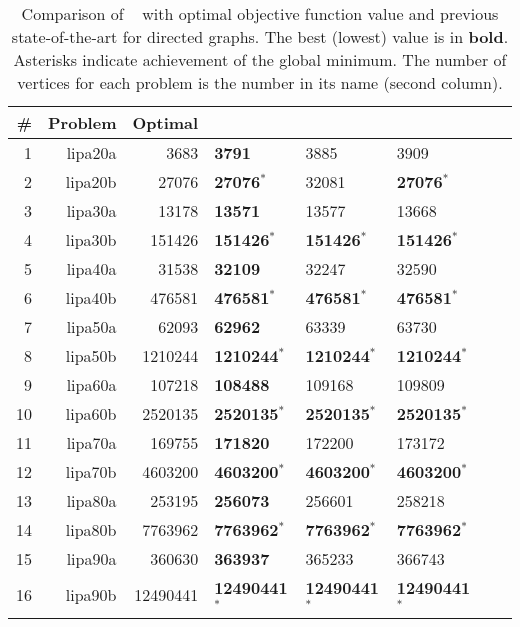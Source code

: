\begin{table}[h!]
\caption{Comparison of \FAQ~ with optimal objective function value and previous state-of-the-art for directed graphs.  The best (lowest) value is in \textbf{bold}. Asterisks indicate achievement of the global minimum.  The number of vertices for each problem is the number in its name (second column).}
\begin{center}
\begin{tabular}{|r|r|r||l|l|l|l|l|}
	\hline 
	          \# &  Problem &      Optimal & \FAQ~ & \Epath~& \Grad~ \\
	\hline 
	           1 &  lipa20a &     3683 & \textbf{3791} &     3885 &     3909 \\ 
	           2 &  lipa20b &    27076 & \textbf{27076}$^*$ &    32081 &    \textbf{27076}$^*$ \\ 
	           3 &  lipa30a &    13178 & \textbf{13571} 	&    13577 &    13668 \\ 
	           4 &  lipa30b &   151426 & \textbf{151426}$^*$ & \textbf{151426}$^*$ &   \textbf{151426}$^*$ \\ 
	           5 &  lipa40a &    31538 & \textbf{32109} 	&    32247 &    32590 \\ 
	           6 &  lipa40b &   476581 & \textbf{476581}$^*$ &   \textbf{476581}$^*$ &   \textbf{476581}$^*$ \\ 
	           7 &  lipa50a &    62093 & \textbf{62962} &    63339 &    63730 \\ 
	           8 &  lipa50b &  1210244 & \textbf{1210244}$^*$ &  \textbf{1210244}$^*$ &  \textbf{1210244}$^*$ \\ 
	           9 &  lipa60a &   107218 & \textbf{108488} &   109168 &   109809 \\ 
	          10 &  lipa60b &  2520135 & \textbf{2520135}$^*$ &  \textbf{2520135}$^*$ &  \textbf{2520135}$^*$ \\ 
	          11 &  lipa70a &   169755 & \textbf{171820} &   172200 &   173172 \\ 
	          12 &  lipa70b &  4603200 & \textbf{4603200}$^*$ &  \textbf{4603200}$^*$ &  \textbf{4603200}$^*$ \\ 
	          13 &  lipa80a &   253195 & \textbf{256073} &   256601 &   258218 \\ 
	          14 &  lipa80b &  7763962 & \textbf{7763962}$^*$ &  \textbf{7763962}$^*$ &  \textbf{7763962}$^*$ \\ 
	          15 &  lipa90a &   360630 & \textbf{363937} &   365233 &   366743 \\ 
	          16 &  lipa90b & 12490441 & \textbf{12490441}$^*$ & \textbf{12490441}$^*$ & \textbf{12490441}$^*$ \\ 
	\hline
	\end{tabular}
\end{center}
\label{tab:directed}
\end{table}%





